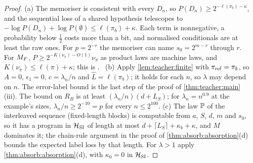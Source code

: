 \begin{proof}
(a) The memoriser is consistent with every $D_n$, so $P(D_n)\ge2^{-\ell(\pi_b)-\kappa}$, and the sequential loss of a shared hypothesis telescopes to $-\log P(D_n)+\log P(\emptyset)\le\ell(\pi_b)+\kappa$. Each term is nonnegative, a probability below $\frac12$ costs more than a bit, and normalised conditionals are at least the raw ones. For $p=2^{-r}$ the memoriser can name $s_0=2^{m-r}$ through $r$. For $M_{F}$, $P\ge2^{-K(\nu_\pi)-O(1)}\nu_\pi$ as product laws are machine laws, and $K(\nu_\pi)\le\ell(\pi)+\kappa$; this is \citet[Corollary~5.4]{claudeSFI2026fundamentals}.%
\
(b) Apply \cref{lem:teacher:finite} with $\pi_{\rm ref}=\pi_b$, so $A=0$, $\epsilon_1=0$, $c=\lambda_n/n$ and $\hat L=\ell(\pi_b)$; it holds for each $n$, so $\lambda$ may depend on $n$. The error-label bound is the last step of the proof of \cref{thm:teacher:main}(iii). The bound on $R_B$ is at least $(\lambda_n/n)(d+L_S)$; for $\lambda_n=n^{0.9}$ at the example's sizes, $\lambda_n/n\ge2^{-10}=p$ for every $n\le2^{100}$.
(c) The law $\mathbb{P}$ of the interleaved sequence (fixed-length blocks) is computable from $a$, $S$, $d$, $m$ and $s_0$, so it has a program in $\mathcal{H}_{\mathrm{SI}}$ of length at most $d+\lceil L_S\rceil+\kappa_b+\kappa$, and $M$ dominates it; the chain-rule argument in the proof of \cref{thm:absorb:absorption}(d) bounds the expected label loss by that length. For $\lambda>1$ apply \cref{thm:absorb:absorption}(d), with $\kappa_0=0$ in $\mathcal{H}_{\mathrm{SI}}$.
\end{proof}

